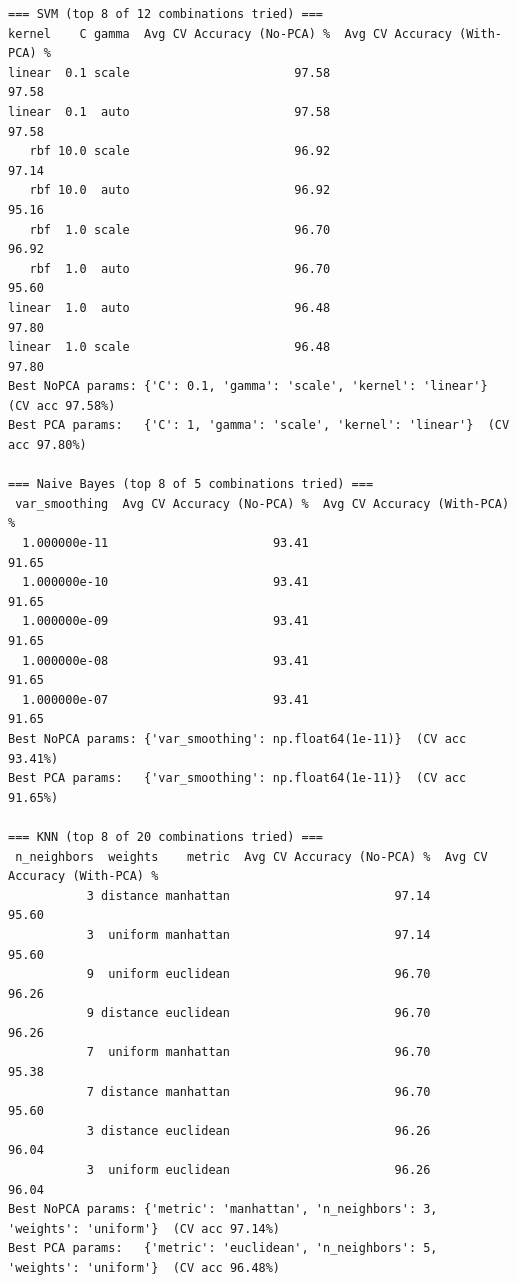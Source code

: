 \documentclass[12pt,a4paper]{article}
\begin{document}
\begin{verbatim}
=== SVM (top 8 of 12 combinations tried) ===
kernel    C gamma  Avg CV Accuracy (No-PCA) %  Avg CV Accuracy (With-PCA) %
linear  0.1 scale                       97.58                         97.58
linear  0.1  auto                       97.58                         97.58
   rbf 10.0 scale                       96.92                         97.14
   rbf 10.0  auto                       96.92                         95.16
   rbf  1.0 scale                       96.70                         96.92
   rbf  1.0  auto                       96.70                         95.60
linear  1.0  auto                       96.48                         97.80
linear  1.0 scale                       96.48                         97.80
Best NoPCA params: {'C': 0.1, 'gamma': 'scale', 'kernel': 'linear'}  (CV acc 97.58%)
Best PCA params:   {'C': 1, 'gamma': 'scale', 'kernel': 'linear'}  (CV acc 97.80%)

=== Naive Bayes (top 8 of 5 combinations tried) ===
 var_smoothing  Avg CV Accuracy (No-PCA) %  Avg CV Accuracy (With-PCA) %
  1.000000e-11                       93.41                         91.65
  1.000000e-10                       93.41                         91.65
  1.000000e-09                       93.41                         91.65
  1.000000e-08                       93.41                         91.65
  1.000000e-07                       93.41                         91.65
Best NoPCA params: {'var_smoothing': np.float64(1e-11)}  (CV acc 93.41%)
Best PCA params:   {'var_smoothing': np.float64(1e-11)}  (CV acc 91.65%)

=== KNN (top 8 of 20 combinations tried) ===
 n_neighbors  weights    metric  Avg CV Accuracy (No-PCA) %  Avg CV Accuracy (With-PCA) %
           3 distance manhattan                       97.14                         95.60
           3  uniform manhattan                       97.14                         95.60
           9  uniform euclidean                       96.70                         96.26
           9 distance euclidean                       96.70                         96.26
           7  uniform manhattan                       96.70                         95.38
           7 distance manhattan                       96.70                         95.60
           3 distance euclidean                       96.26                         96.04
           3  uniform euclidean                       96.26                         96.04
Best NoPCA params: {'metric': 'manhattan', 'n_neighbors': 3, 'weights': 'uniform'}  (CV acc 97.14%)
Best PCA params:   {'metric': 'euclidean', 'n_neighbors': 5, 'weights': 'uniform'}  (CV acc 96.48%)


\end{verbatim}
\end{document}
